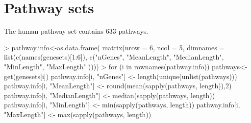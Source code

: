 \documentclass{article}
\renewenvironment{Schunk}{\vspace{\topsep}}{\vspace{\topsep}}
\begin{document}
\section{Pathway sets}
The human pathway set contains 633 pathways.
\begin{Schunk}
\begin{Sinput}
> pathway.info<-as.data.frame(
   matrix(nrow = 6, ncol = 5,
   dimnames = list(c(names(genesets)[1:6]),
                   c("nGenes", "MeanLength",
                     "MedianLength", "MinLength", "MaxLength"
                     ))))
> for (i in rownames(pathway.info)){
   pathways<-get(genesets[i])
   pathway.info[i, "nGenes"] <- length(unique(unlist(pathways)))
   pathway.info[i, "MeanLength"] <- round(mean(sapply(pathways, length)),2)
   pathway.info[i, "MedianLength"] <- median(sapply(pathways, length))
   pathway.info[i, "MinLength"] <- min(sapply(pathways, length))
   pathway.info[i, "MaxLength"] <- max(sapply(pathways, length))
   }
\end{Sinput}
\end{Schunk}
\end{document}
